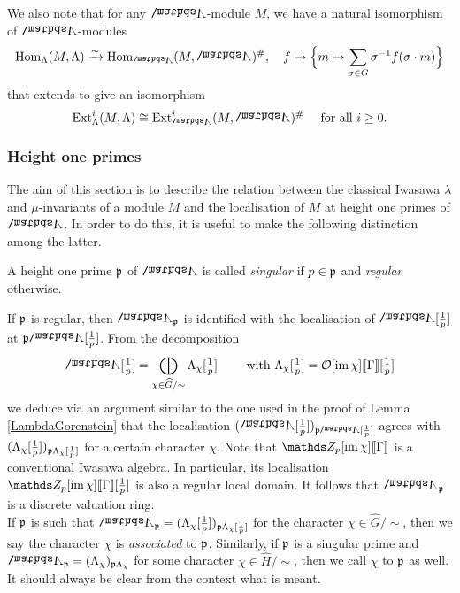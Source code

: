 \documentclass[a4paper, 
headsepline=off, DIV=12, titlepage=false]{scrartcl}
\begin{document}
We also note that for any $\bLambda$-module $M$, we have a natural isomorphism of $\bLambda$-modules
\[
\Hom_\Lambda (M, \Lambda) \xrightarrow{\sim} \Hom_\bLambda (M, \bLambda)^\#, \quad f \mapsto \Big \{ m \mapsto \sum_{\sigma \in G} \sigma^{-1} f(\sigma \cdot m) \Big \}
\]
that extends to give an isomorphism
\begin{equation} \label{Exts}
\Ext^i_\Lambda (M, \Lambda) \cong \Ext^i_\bLambda (M, \bLambda)^\# \quad \text{ for all } i \geq 0. 
\end{equation}


\tocless\subsubsection{Height one primes} \label{HeightOnePrimesSection}

The aim of this section is to describe the relation between the classical Iwasawa $\lambda$ and $\mu$-invariants of a module $M$ and the localisation of $M$ at height one primes of $\bLambda$. In order to do this, it is useful to make the following distinction among the latter. 

\begin{definition}
A height one prime $\mathfrak{p}$ of $\bLambda$ is called \emph{singular} if $p \in \mathfrak{p}$ and \emph{regular} otherwise. 
\end{definition}

If $\mathfrak{p}$ is regular, then $\bLambda_\p$ is identified with the localisation of $\bLambda [\tfrac{1}{p}]$ at $\p \bLambda [\tfrac{1}{p}]$. From the decomposition
\[
\bLambda [\tfrac{1}{p}] = \bigoplus_{\chi \in \widehat{G} / \sim} \Lambda_\chi [\tfrac{1}{p}] \qquad
\text{ with } \Lambda_\chi [\tfrac{1}{p}] = \bigO [\im \chi] \llbracket \Gamma \rrbracket [\tfrac{1}{p}]
\]
we deduce via an argument similar to the one used in the proof of Lemma \ref{LambdaGorenstein} that the localisation $(\bLambda [\tfrac{1}{p}])_{\p \bLambda [\frac{1}{p}]}$ agrees with $(\Lambda_\chi [\tfrac{1}{p}])_{\mathfrak{p}\Lambda_\chi [\frac{1}{p}] }$ for a certain character $\chi$. 
Note that $\Z_p [\im \chi] \llbracket \Gamma \rrbracket$ is a conventional Iwasawa algebra. In particular, its localisation $\Z_p [\im \chi] \llbracket \Gamma \rrbracket [\tfrac{1}{p}]$ is also a regular local domain. It follows that $\bLambda_\p$ is a discrete valuation ring. 
\\
If $\mathfrak{p}$ is such that $\bLambda_\p = (\Lambda_\chi [\tfrac{1}{p}])_{\p\Lambda_\chi [\frac{1}{p}] }$ for the character $\chi \in \widehat{G} / \sim$, then we say the character $\chi$ is \textit{associated} to $\mathfrak{p}$. Similarly, if $\mathfrak{p}$ is a singular prime and $\bLambda_\p = (\Lambda_\chi)_{\p \Lambda_\chi}$ for some character $\chi \in \widehat{H} /\sim$, then we call $\chi$  to $\mathfrak{p}$ as well. It should always be clear from the context what is meant. 
\end{document}
